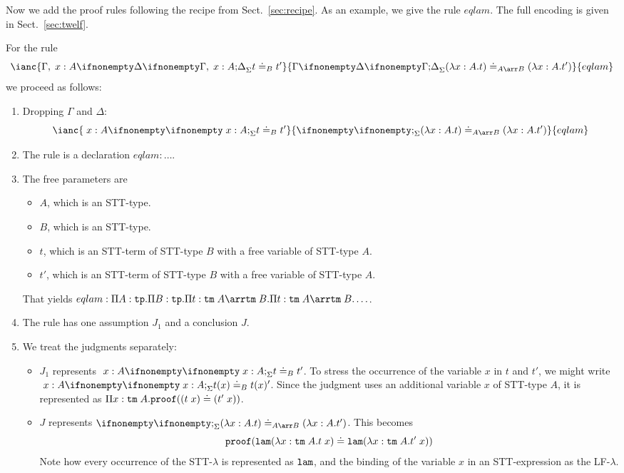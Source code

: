 Now we add the proof rules following the recipe from Sect.~\ref{sec:recipe}. As an example, we give the rule $eqlam$. The full encoding is given in Sect.~\ref{sec:twelf}.

For the rule
\[\ianc{\iscons{\Sigma}{\Gamma,\;x:A}{\Delta}{t\doteq_B t'}}
     {\iscons{\Sigma}{\Gamma}{\Delta}{(\lam{x}{A}t)\doteq_{A\arr B} (\lam{x}{A}t')}}
     {eqlam}\]
we proceed as follows:

\begin{enumerate}
	\item Dropping $\Gamma$ and $\Delta$:
    \[\ianc{\iscons{\Sigma}{\;x:A}{}{t\doteq_B t'}}
     {\iscons{\Sigma}{}{}{(\lam{x}{A}t)\doteq_{A\arr B} (\lam{x}{A}t')}}
     {eqlam}\]
  \item The rule is a declaration $eqlam:\ldots$.
  \item The free parameters are
     \begin{itemize}
	     \item $A$, which is an STT-type.
	     \item $B$, which is an STT-type.
	     \item $t$, which is an STT-term of STT-type $B$ with a free variable of STT-type $A$.
	     \item $t'$, which is an STT-term of STT-type $B$ with a free variable of STT-type $A$.
     \end{itemize}
  That yields $eqlam:\P{A}{\Type}\P{B}{\Type}\P{t}{\Term\;A\arr\Term\;B}\P{t}{\Term\;A\arr\Term\;B}\ldots$.
  \item The rule has one assumption $J_1$ and a conclusion $J$.
  \item We treat the judgments separately:
    \begin{itemize}
	    \item $J_1$ represents $\iscons{\Sigma}{\;x:A}{}{t\doteq_B t'}$. To stress the occurrence of the variable $x$ in $t$ and $t'$, we might write $\iscons{\Sigma}{\;x:A}{}{t(x)\doteq_B t(x)'}$. Since the judgment uses an additional variable $x$ of STT-type $A$, it is represented as $\Pi x:\mathtt{tm}\;A.\mathtt{proof}((t\;x)\doteq(t'\;x))$.
	    \item $J$ represents $\iscons{\Sigma}{}{}{(\lam{x}{A}t)\doteq_{A\arr B} (\lam{x}{A}t')}$. This becomes
	    \[\mathtt{proof}(\mathtt{lam}(\lambda x:\mathtt{tm}\;A.t\;x) \doteq \mathtt{lam}(\lambda x:\mathtt{tm}\;A.t'\;x))\]
	    Note how every occurrence of the STT-$\lambda$ is represented as $\mathtt{lam}$, and the binding of the variable $x$ in an STT-expression as the LF-$\lambda$.
    \end{itemize}
\end{enumerate}

